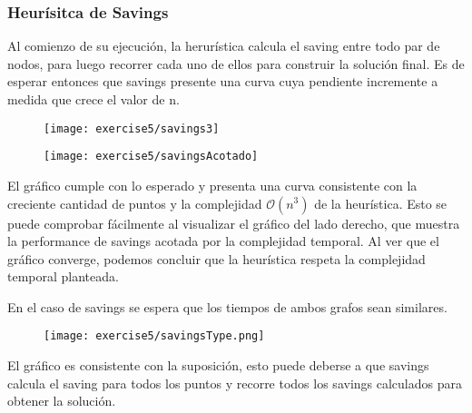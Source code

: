 \subsubsection{Heurísitca de Savings}


Al comienzo de su ejecución, la herurística calcula el saving entre todo par de nodos, para luego recorrer cada uno de ellos para construir la solución final. Es de esperar entonces que savings presente una curva cuya pendiente incremente a medida que crece el valor de n.

\begin{figure}[H]
	\centering
	\begin{minipage}[t]{.45\textwidth}
		\centering
		\texttt{[image: exercise5/savings3]}
	\end{minipage}\qquad
	\begin{minipage}[t]{.45\textwidth}
		\centering
		\texttt{[image: exercise5/savingsAcotado]}
	\end{minipage}
\end{figure}

El gráfico cumple con lo esperado y presenta una curva consistente con la creciente cantidad de puntos y la complejidad $\mathcal{O}(n^{3})$ de la heurística. Esto se puede comprobar fácilmente al visualizar el gráfico del lado derecho, que muestra la performance de savings acotada por la complejidad temporal. Al ver que el gráfico converge, podemos concluir que la heurística respeta la complejidad temporal planteada.



En el caso de savings se espera que los tiempos de ambos grafos sean similares.

\begin{figure}[H]
	\centering
	\texttt{[image: exercise5/savingsType.png]}
\end{figure}

El gráfico es consistente con la suposición, esto puede deberse a que savings calcula el saving para todos los puntos y recorre todos los savings calculados para obtener la solución.
